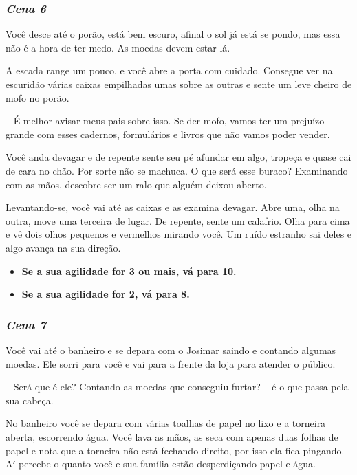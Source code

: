 \bigskip\medskip

\subsubsection{\textit{\textbf{Cena 6}}}

Você desce até o porão, está bem escuro, afinal o sol já está se pondo, mas essa não é a hora de ter medo. As moedas devem estar lá.

A escada range um pouco, e você abre a porta com cuidado. Consegue ver na escuridão várias caixas empilhadas umas sobre as outras e sente um leve cheiro de mofo no porão.

-- É melhor avisar meus pais sobre isso. Se der mofo, vamos ter um prejuízo grande com esses cadernos, formulários e livros que não vamos poder vender.

Você anda devagar e de repente sente seu pé afundar em algo, tropeça e quase cai de cara no chão. Por sorte não se machuca. O que será esse buraco? Examinando com as mãos, descobre ser um ralo que alguém deixou aberto.

Levantando-se, você vai até as caixas e as examina devagar. Abre uma, olha na outra, move uma terceira de lugar. De repente, sente um calafrio. Olha para cima e vê dois olhos pequenos e vermelhos mirando você. Um ruído estranho sai deles e algo avança na sua direção.

\begin{itemize}
	\item \textbf{Se a sua agilidade for 3 ou mais, vá para 10.}
	\item \textbf{Se a sua agilidade for 2, vá para 8.}
\end{itemize}

\bigskip\medskip

\subsubsection{\textit{\textbf{Cena 7}}}

Você vai até o banheiro e se depara com o Josimar saindo e contando algumas moedas. Ele sorri para você e vai para a frente da loja para atender o público.

-- Será que é ele? Contando as moedas que conseguiu furtar? -- é o que passa pela sua cabeça.

No banheiro você se depara com várias toalhas de papel no lixo e a torneira aberta, escorrendo água. Você lava as mãos, as seca com apenas duas folhas de papel e nota que a torneira não está fechando direito, por isso ela fica pingando. Aí percebe o quanto você e sua família estão desperdiçando papel e água.


